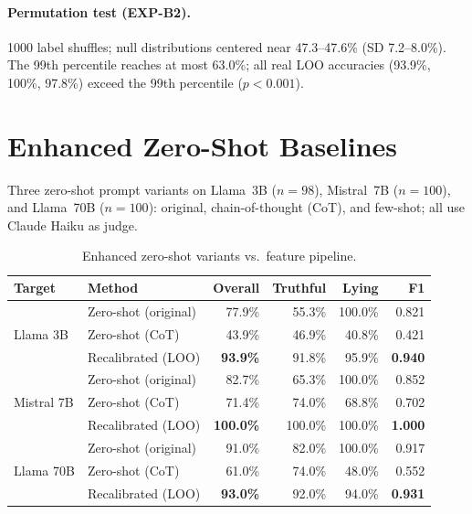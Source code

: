 \paragraph{Permutation test (EXP-B2).}
1000 label shuffles; null distributions centered near 47.3--47.6\% (SD 7.2--8.0\%). The 99th percentile reaches at most 63.0\%; all real LOO accuracies (93.9\%, 100\%, 97.8\%) exceed the 99th percentile ($p<0.001$).

\section{Enhanced Zero-Shot Baselines}
\label{app:zero_shot}
\label{sec:zero_shot}

Three zero-shot prompt variants on Llama~3B ($n=98$), Mistral~7B ($n=100$), and Llama~70B ($n=100$): original, chain-of-thought (CoT), and few-shot; all use Claude Haiku as judge.

\begin{table}[h]
\centering
\caption{Enhanced zero-shot variants vs.\ feature pipeline.}
\label{tab:zero_shot_comparison}
\begin{tabular}{llrrrr}
\toprule
\textbf{Target} & \textbf{Method} & \textbf{Overall} & \textbf{Truthful} & \textbf{Lying} & \textbf{F1} \\
\midrule
\multirow{3}{*}{Llama 3B}
  & Zero-shot (original)  & 77.9\% & 55.3\% & 100.0\% & 0.821 \\
  & Zero-shot (CoT)       & 43.9\% & 46.9\% & 40.8\%  & 0.421 \\
  & Recalibrated (LOO)    & \textbf{93.9\%} & 91.8\% & 95.9\%  & \textbf{0.940} \\
\midrule
\multirow{3}{*}{Mistral 7B}
  & Zero-shot (original)  & 82.7\% & 65.3\% & 100.0\% & 0.852 \\
  & Zero-shot (CoT)       & 71.4\% & 74.0\% & 68.8\%  & 0.702 \\
  & Recalibrated (LOO)    & \textbf{100.0\%} & 100.0\% & 100.0\% & \textbf{1.000} \\
\midrule
\multirow{3}{*}{Llama 70B}
  & Zero-shot (original)  & 91.0\% & 82.0\% & 100.0\% & 0.917 \\
  & Zero-shot (CoT)       & 61.0\% & 74.0\% & 48.0\%  & 0.552 \\
  & Recalibrated (LOO)    & \textbf{93.0\%} & 92.0\% & 94.0\%  & \textbf{0.931} \\
\bottomrule
\end{tabular}
\end{table}

